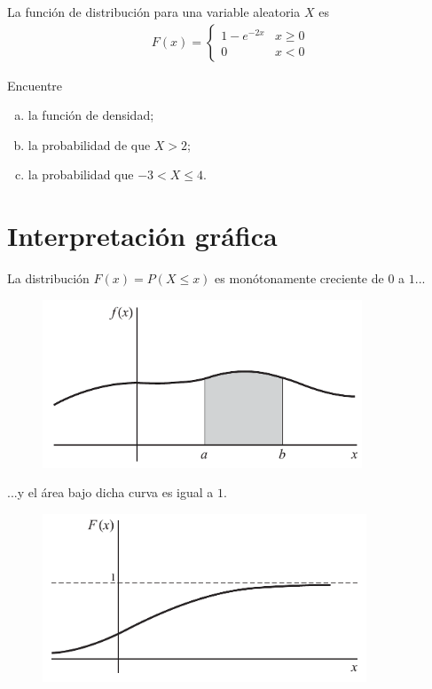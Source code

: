  \begin{ejemplo}
  \label{sol:2.7}
  La función de distribución para una variable aleatoria $X$ es
  \begin{align}
   F(x)=
   \begin{cases}
    1-e^{-2x} & x\geq 0 \\
    0 & x <0
   \end{cases}
  \end{align}

  Encuentre
  \begin{enumerate}[(a)]
   \item la función de densidad;
   \item la probabilidad de que $X>2$;
   \item la probabilidad que $-3 < X \leq 4.$
  \end{enumerate}


 \end{ejemplo}



\section{Interpretación gráfica}


	La distribución $F(x)=P(X\leq x)$ es monótonamente creciente de $0$ a $1...$
	\begin{figure}
	\centering
	\includegraphics[height=5cm,keepaspectratio=true]{./pe/pands0202.png}
\end{figure}




  ...y el área bajo dicha curva es igual a $1.$
  \begin{figure}
	\centering
	\includegraphics[height=5cm,keepaspectratio=true]{./pe/pands0203.png}
\end{figure}




